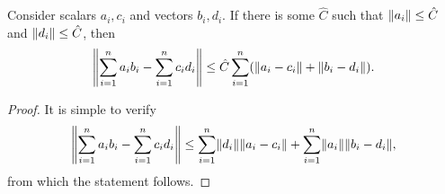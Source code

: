 \begin{lemma}\label{lemma:product}
  Consider scalars $a_i,c_i$ and vectors $b_i,d_i$. If there is some $\hat C$ such that $\nrm{a_i}\le \hat C$ and $\norm{d_i}\le \hat C$, then
  \begin{equation*}
    \norm{\sum_{i=1}^n a_ib_i - \sum_{i=1}^n c_id_i}
    \le \hat C\sum_{i=1}^n \Brac{\nrm{a_i-c_i} + \norm{b_i-d_i}}.
  \end{equation*}
\end{lemma}
\begin{proof}
  It is simple to verify
  \begin{equation*}
    \norm{\sum_{i=1}^n a_ib_i - \sum_{i=1}^n c_id_i} \le \sum_{i=1}^n \norm{d_i}\nrm{a_i-c_i} + \sum_{i=1}^n \nrm{a_i}\norm{b_i-d_i},
  \end{equation*}
  from which the statement follows.
\end{proof}